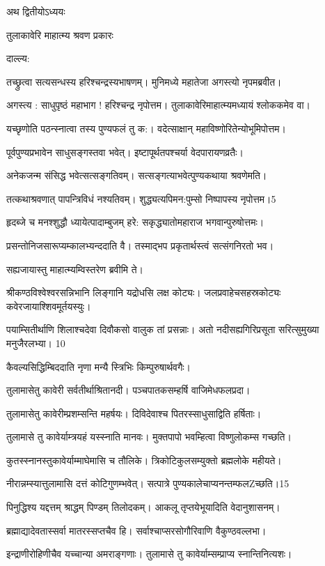 अथ द्वितीयोऽध्ययः

तुलाकावेरि माहात्म्य श्रवण प्रकारः 

 
दाल्ल्य:

तच्छ्रुत्वा सत्यसन्धस्य हरिश्चन्द्रस्यभाषणम्।
मुनिमध्ये महातेजा अगस्त्यो नृपमब्रवीत।
 
अगस्त्य : साधुपृष्ठं महाभाग ! हरिश्चन्द्र नृपोत्तम।
 तुलाकावेरिमाहात्म्यमध्यायं श्लोककमेव वा।

 यच्छृणोति पठन्स्नात्वा तस्य पुण्यफलं तु क:।
 वदेत्साक्षान् महाविष्णोरितेन्योभूमिपोत्तम।
 
 पूर्वपुण्यप्रभावेन साधुसङ्गस्तवा भवेत्।
 इष्टापूर्थतपश्चर्या वेदपारायणव्रतैः।
 
 अनेकजन्म संसिद्ध भवेत्सत्सङ्गतिवम्।
 सत्सङ्गत्याभवेत्पुण्यकथाया श्रवणेमति।
 
 तत्कथाश्रवणात् पापन्त्रिविधं नश्यतिवम्।
 शुद्ध्यत्यपिमन:पुम्सो निष्पापस्य नृपोत्तम।5

हृदब्जे च मनश्शुद्धौ ध्यायेत्पादाम्बुजम् हरे:
सकृद्ध्यातोमहाराज भगवान्पुरुषोत्तमः।

 प्रसन्तोनिजसारूप्यम्कालभ्यन्ददाति वै।
 तस्माद्भप प्रकृतार्थस्त्वं सत्संगनिरतो भव।

 सह्यजायास्तु माहात्म्यम्विस्तरेण ब्रवीमि ते।

 श्रीकण्ठविश्वेश्वरसन्निभानि
 लिङ्गानि यद्रोधसि लक्ष कोट्यः।
 जलप्रवाहेचसहस्रकोट्यः 
 कवेरजायाश्शिवमूर्तयस्युः।

पयाम्सितीर्थाणि शिलाश्चदेवा
दिवौकसो वालुक तां प्रसन्नाः।
 अतो नदीसह्यगिरिप्रसूता 
सरित्सुमुख्या मनुजैरलभ्या। 10

 कैवल्यसिद्धिम्बिददाति नृणा 
मन्यै स्त्रिभिः किम्पुरुषार्थवगैः।
 
 तुलामासेतु कावेरी सर्वतीर्थाश्रितानदी।
 पञ्चपातकसम्हर्षि वाजिमेधफलप्रदा।
 
 तुलामासेतु कावेरीम्प्रशम्सन्ति महर्षयः।
 दिविदेवाश्च पितरस्साधुसाद्विति हर्षिताः।
 
 तुलामासे तु कावेर्याम्त्रयहं यस्स्नाति मानवः।
 मुक्तपापो भवम्हित्वा विष्णुलोकम्स गच्छति।
 
कुतस्स्नानस्तुकावेर्याम्माघेमासि च तौलिके।
त्रिकोटिकुलसम्युक्तो ब्रह्मलोके महीयते।

 नीरान्नम्स्यात्तुलामासि दत्तं कोटिगुणम्भवेत्।
 सत्पात्रे पुण्यकालेचाप्यनन्तम्फलZच्छति।15

पिनुद्धिश्य यद्दत्तम् श्राद्धम् पिण्डम् तिलोदकम्।
आकलू तृप्तयेभूयादिति वेदानुशासनम्।

 ब्रह्माद्यादेवतास्सर्वा मातरस्सप्तचैव हि।
 सर्वाश्चाप्सरसोगौरिवाणि वैकुण्ठवल्लभा।

 इन्द्राणीरोहिणीचैव यच्चान्या अमराङ्गणाः।
 तुलामासे तु कावेर्याम्सम्प्राप्य स्नान्तिनित्यशः।


